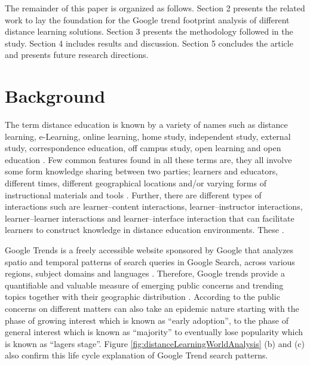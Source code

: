 \documentclass[11pt,a4paper,]{article}
\begin{document}
The remainder of this paper is organized as follows. Section 2 presents the related work to lay the foundation for the Google trend footprint analysis of different distance learning solutions. Section 3 presents the methodology followed in the study. Section 4 includes results and discussion. Section 5 concludes the article and presents future research directions.

\hypertarget{background}{%
\section{Background}\label{background}}

The term distance education is known by a variety of names such as distance learning, e-Learning, online learning, home study, independent study, external study, correspondence education, off campus study, open learning and open education \autocite{moore2011learning}. Few common features found in all these terms are, they all involve some form knowledge sharing between two parties; learners and educators, different times, different geographical locations and/or varying forms of instructional materials and tools \autocite{moore2011learning}. Further, there are different types of interactions such are learner--content interactions, learner--instructor interactions, learner--learner interactions and learner--interface interaction that can facilitate learners to construct knowledge in distance education environments. These \autocite{wallace2003online}.

Google Trends is a freely accessible website sponsored by Google that analyzes spatio and temporal patterns of search queries in Google Search, across various regions, subject domains and languages \autocite{carneiro2009google}. Therefore, Google trends provide a quantifiable and valuable measure of emerging public concerns and trending topics together with their geographic distribution \autocite{alicino2015assessing,cook2011assessing}. According to \textcite{jarynowski2020perception} the public concerns on different matters can also take an epidemic nature starting with the phase of growing interest which is known as ``early adoption'', to the phase of general interest which is known as ``majority'' to eventually lose popularity which is known as ``lagers stage''. Figure \ref{fig:distanceLearningWorldAnalysis} (b) and (c) also confirm this life cycle explanation of Google Trend search patterns.
\end{document}
